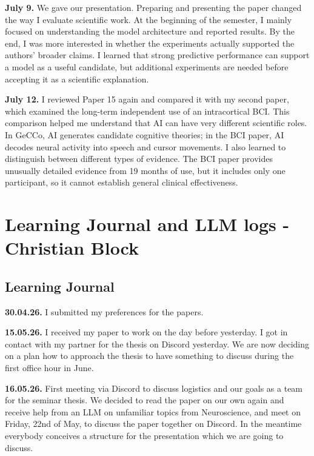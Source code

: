 \textbf{July 9.} We gave our presentation. Preparing and presenting the paper changed the way I evaluate scientific work. At the beginning of the semester, I mainly focused on understanding the model architecture and reported results. By the end, I was more interested in whether the experiments actually supported the authors' broader claims. I learned that strong predictive performance can support a model as a useful candidate, but additional experiments are needed before accepting it as a scientific explanation.
 
\textbf{July 12.} I reviewed Paper 15 again and compared it with my second paper, which examined the long-term independent use of an intracortical BCI. This comparison helped me understand that AI can have very different scientific roles. In GeCCo, AI generates candidate cognitive theories; in the BCI paper, AI decodes neural activity into speech and cursor movements. I also learned to distinguish between different types of evidence. The BCI paper provides unusually detailed evidence from 19 months of use, but it includes only one participant, so it cannot establish general clinical effectiveness.
 
 
\section{Learning Journal and LLM logs - Christian Block}
 
\subsection*{Learning Journal}
 
\textbf{30.04.26.} I submitted my preferences for the papers.
 
\textbf{15.05.26.} I received my paper to work on the day before yesterday. I got in contact with my partner for the thesis on Discord yesterday. We are now deciding on a plan how to approach the thesis to have something to discuss during the first office hour in June.
 
\textbf{16.05.26.} First meeting via Discord to discuss logistics and our goals as a team for the seminar thesis. We decided to read the paper on our own again and receive help from an LLM on unfamiliar topics from Neuroscience, and meet on Friday, 22nd of May, to discuss the paper together on Discord. In the meantime everybody conceives a structure for the presentation which we are going to discuss.
 
